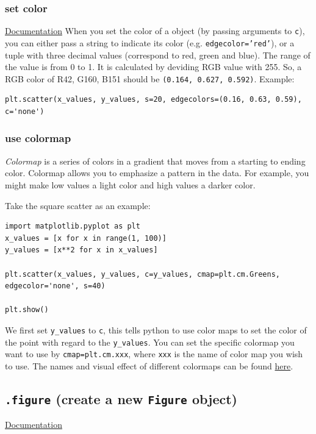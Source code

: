 \documentclass[12pt]{book}
\begin{document}
\subsubsection{set color}
\label{sec:org1e31625}
\href{https://matplotlib.org/2.0.2/api/colors\_api.html}{Documentation}
When you set the color of a object (by passing arguments to \texttt{c}), you can either pass a string to indicate its color (e.g. \texttt{edgecolor='red'}), or a tuple with three decimal values (correspond to red, green and blue). The range of the value is from 0 to 1. It is calculated by deviding RGB value with 255. So, a RGB color of R42, G160, B151 should be \texttt{(0.164, 0.627, 0.592)}. Example:
\begin{verbatim}
plt.scatter(x_values, y_values, s=20, edgecolors=(0.16, 0.63, 0.59), c='none')
\end{verbatim}

\subsubsection{use colormap}
\label{sec:org1e1c980}
\emph{Colormap} is a series of colors in a gradient that moves from a starting to ending color. Colormap allows you to emphasize a pattern in the data. For example, you might make low values a light color and high values a darker color.

Take the square scatter as an example:
\begin{verbatim}
import matplotlib.pyplot as plt
x_values = [x for x in range(1, 100)]
y_values = [x**2 for x in x_values]

plt.scatter(x_values, y_values, c=y_values, cmap=plt.cm.Greens, edgecolor='none', s=40)

plt.show()
\end{verbatim}
We first set \texttt{y\_values} to \texttt{c}, this tells python to use color maps to set the color of the point with regard to the \texttt{y\_values}. You can set the specific colormap you want to use by \texttt{cmap=plt.cm.xxx}, where \texttt{xxx} is the name of color map you wish to use. The names and visual effect of different colormaps can be found \href{https://matplotlib.org/examples/color/colormaps\_reference.html}{here}.

\subsection{\texttt{.figure} (create a new \texttt{Figure} object)}
\label{sec:orgd0bb9a1}
\href{https://matplotlib.org/3.1.0/api/\_as\_gen/matplotlib.pyplot.figure.html}{Documentation}
\end{document}
